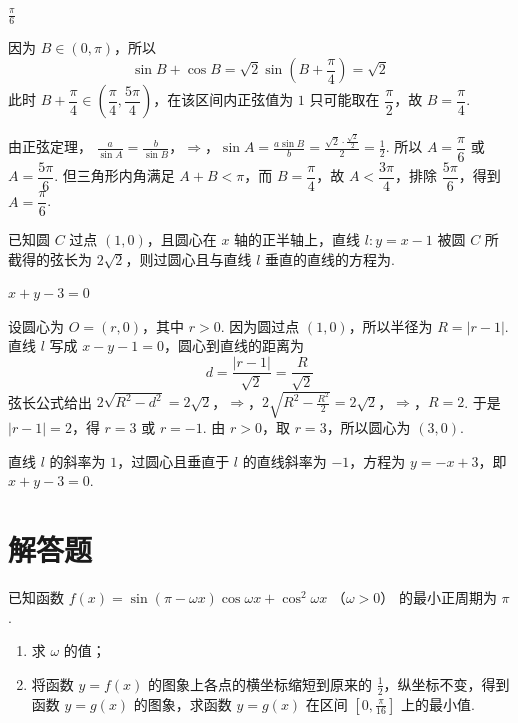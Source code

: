 \begin{answer}
\(\frac{\pi}{6}\)
\end{answer}

\begin{solution}
因为 \(B\in(0,\pi)\)，所以
\[
\sin B+\cos B=\sqrt2\sin\left(B+\frac\pi4\right)=\sqrt2
\]
此时 \(B+\dfrac\pi4\in\left(\dfrac\pi4,\dfrac{5\pi}{4}\right)\)，在该区间内正弦值为 \(1\) 只可能取在 \(\dfrac\pi2\)，故 \(B=\dfrac\pi4\).

由正弦定理，
\(\frac{a}{\sin A}=\frac{b}{\sin B}\)，\(\Longrightarrow\)，\(\sin A=\frac{a\sin B}{b}=\frac{\sqrt2\cdot\frac{\sqrt2}{2}}{2}=\frac12\).
所以 \(A=\dfrac\pi6\) 或 \(A=\dfrac{5\pi}{6}\). 但三角形内角满足 \(A+B<\pi\)，而 \(B=\dfrac\pi4\)，故 \(A<\dfrac{3\pi}{4}\)，排除 \(\dfrac{5\pi}{6}\)，得到 \(A=\dfrac\pi6\).
\end{solution}

\begin{problem}
已知圆 \(C\) 过点 \((1,0)\)，且圆心在 \(x\) 轴的正半轴上，直线 \(l: y = x - 1\) 被圆 \(C\) 所截得的弦长为 \(2\sqrt{2}\)，则过圆心且与直线 \(l\) 垂直的直线的方程为\fillinblank{}.
\end{problem}

\begin{answer}
\(x+y-3=0\)
\end{answer}

\begin{solution}
设圆心为 \(O=(r,0)\)，其中 \(r>0\). 因为圆过点 \((1,0)\)，所以半径为 \(R=|r-1|\). 直线 \(l\) 写成 \(x-y-1=0\)，圆心到直线的距离为
\[
d=\frac{|r-1|}{\sqrt2}=\frac{R}{\sqrt2}
\]
弦长公式给出
\(2\sqrt{R^2-d^2}=2\sqrt2\)，\(\Longrightarrow\)，\(2\sqrt{R^2-\frac{R^2}{2}}=2\sqrt2\)，\(\Longrightarrow\)，\(R=2\).
于是 \(|r-1|=2\)，得 \(r=3\) 或 \(r=-1\). 由 \(r>0\)，取 \(r=3\)，所以圆心为 \((3,0)\).

直线 \(l\) 的斜率为 \(1\)，过圆心且垂直于 \(l\) 的直线斜率为 \(-1\)，方程为 \(y=-x+3\)，即 \(x+y-3=0\).
\end{solution}

\section{解答题}

\begin{problem}
已知函数 \(f(x) = \sin(\pi - \omega x)\cos \omega x + \cos^2\omega x\) （\(\omega > 0\)） 的最小正周期为 \(\pi\).

\begin{enumerate}
\item 求 \(\omega\) 的值；
\item 将函数 \(y = f(x)\) 的图象上各点的横坐标缩短到原来的 \(\frac{1}{2}\)，纵坐标不变，得到函数 \(y = g(x)\) 的图象，求函数 \(y = g(x)\) 在区间 \(\left[0, \frac{\pi}{16}\right]\) 上的最小值.
\end{enumerate}
\end{problem}

